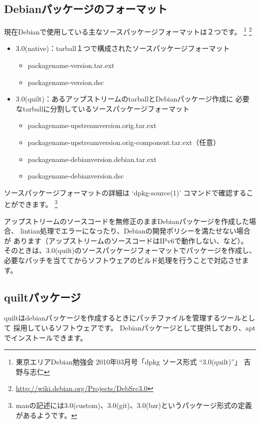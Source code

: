 \documentclass[mingoth,a4paper]{jsarticle}
\begin{document}
\subsection{Debianパッケージのフォーマット}

現在Debianで使用している主なソースパッケージフォーマットは２つです。
\footnote{東京エリアDebian勉強会 2010年03月号「dpkg ソース形式 ``3.0(quilt)''」 吉野与志仁}
\footnote{\url{http://wiki.debian.org/Projects/DebSrc3.0}}

\begin{itemize}
 \item{3.0(native)：tarball１つで構成されたソースパッケージフォーマット}
  \begin{itemize}
   \item{packagename-version.tar.ext}
   \item{packagename-version.dsc}
  \end{itemize}
  \item{3.0(quilt)：あるアップストリームのtarballとDebianパッケージ作成に
必要なtarballに分割しているソースパッケージフォーマット}
  \begin{itemize}
   \item{packagename-upstreamversion.orig.tar.ext}
   \item{packagename-upstreamversion.orig-component.tar.ext（任意）}
   \item{packagename-debianversion.debian.tar.ext}
   \item{packagename-debianversion.dsc}
  \end{itemize}
\end{itemize}

ソースパッケージフォーマットの詳細は `dpkg-source(1)' コマンドで確認することができます。
\footnote{manの記述には3.0(custom)、3.0(git)、3.0(bzr)というパッケージ形式の定義があるようです。}

アップストリームのソースコードを無修正のままDebianパッケージを作成した場合、
lintian処理でエラーになったり、Debianの開発ポリシーを満たせない場合が
あります（アップストリームのソースコードはIPv6で動作しない、など）。
そのときは、3.0(quilt)のソースパッケージフォーマットでパッケージを作成し、
必要なパッチを当ててからソフトウェアのビルド処理を行うことで対応させます。

\subsection{quiltパッケージ}
quiltはdebianパッケージを作成するときにパッチファイルを管理するツールとして
採用しているソフトウェアです。
Debianパッケージとして提供しており、aptでインストールできます。
\end{document}
